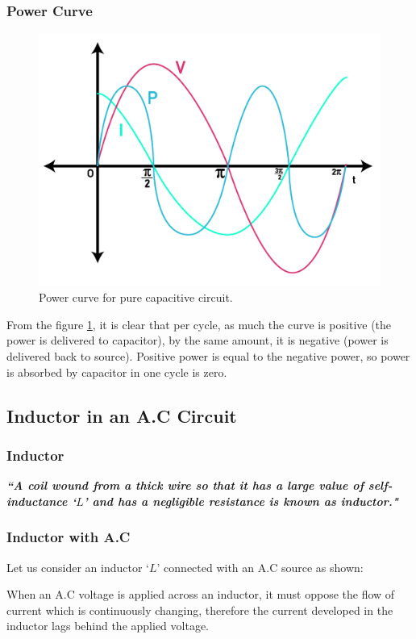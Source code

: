\subsubsection{Power Curve}
\begin{figure}[H]
    \centering
    \includegraphics[]{Images/Chapter-15/15.14}
    \caption{Power curve for pure capacitive circuit.}
    \label{fig:15.14}
\end{figure}
From the figure \ref{fig:15.14}, it is clear that per cycle, as much the curve is
positive (the power is delivered to capacitor), by the same amount,
it is negative (power is delivered back to source). Positive power is
equal to the negative power, so power is absorbed by capacitor in one
cycle is zero.
\subsection{Inductor in an A.C Circuit}
\subsubsection{Inductor}
\textit{\textbf{``A coil wound from a thick wire so that it has a
large value of self-inductance ‘$L$’ and has a negligible resistance
is known as inductor."}} 
\subsubsection{Inductor with A.C}
Let us consider an inductor ‘$L$’ connected with an A.C source as shown:
   
When an A.C voltage is applied across an inductor,
it must oppose the flow of current which is continuously changing,
therefore the current developed in the inductor lags behind
the applied voltage.

